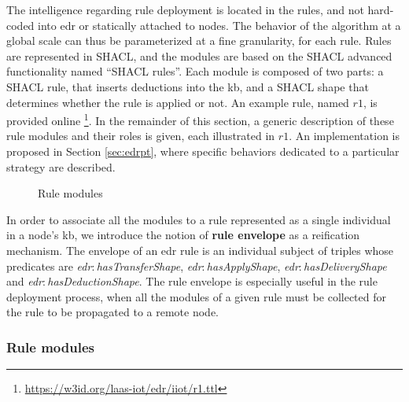 \documentclass{iosart2c}
\newcommand{\namespace}[1]{\textit{#1$:$}}
\newcommand{\concept}[2]{\namespace{#1}\-\textit{#2}}
\begin{document}
The intelligence regarding rule deployment is located in the rules, and not hard-coded into \gls{edr} or statically attached to nodes. 
The behavior of the algorithm at a global scale can thus be parameterized at a fine granularity, for each rule.
Rules are represented in SHACL, and the modules are based on the SHACL advanced functionality named ``SHACL rules''.
Each module is composed of two parts: a SHACL rule, that inserts deductions into the \gls{kb}, and a SHACL shape that determines whether the rule is applied or not. 
An example rule, named $r1$, is provided online \footnote{\url{https://w3id.org/laas-iot/edr/iiot/r1.ttl}}.
In the remainder of this section, a generic description of these rule modules and their roles is given, each illustrated in $r1$. 
An implementation is proposed in Section \textsection \ref{sec:edrpt}, where specific behaviors dedicated to a particular strategy are described.

\begin{figure}
	\centering
	\caption{Rule modules}
	\label{fig:rule_modules}
	\scalebox{0.68}{
		
	}
\end{figure}

In order to associate all the modules to a rule represented as a single individual in a node's \gls{kb}, we introduce the notion of \textbf{rule envelope} as a reification mechanism. 
The envelope of an \gls{edr} rule is an individual subject of triples whose predicates are \concept{edr}{has\-Transfer\-Shape}, \concept{edr}{has\-Apply\-Shape}, \concept{edr}{has\-Delivery\-Shape} and \concept{edr}{has\-Deduction\-Shape}.
The rule envelope is especially useful in the rule deployment process, when all the modules of a given rule must be collected for the rule to be propagated to a remote node.

\subsubsection{Rule modules}
\label{subsubs:modules}
\end{document}
